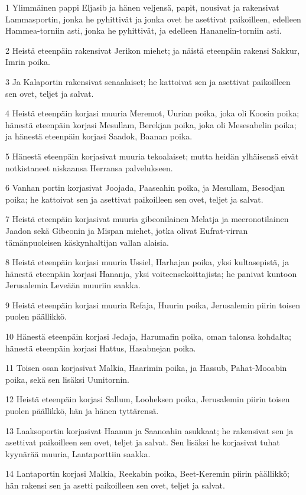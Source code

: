 \par 1 Ylimmäinen pappi Eljasib ja hänen veljensä, papit, nousivat ja rakensivat Lammasportin, jonka he pyhittivät ja jonka ovet he asettivat paikoilleen, edelleen Hammea-torniin asti, jonka he pyhittivät, ja edelleen Hananelin-torniin asti.
\par 2 Heistä eteenpäin rakensivat Jerikon miehet; ja näistä eteenpäin rakensi Sakkur, Imrin poika.
\par 3 Ja Kalaportin rakensivat senaalaiset; he kattoivat sen ja asettivat paikoilleen sen ovet, teljet ja salvat.
\par 4 Heistä eteenpäin korjasi muuria Meremot, Uurian poika, joka oli Koosin poika; hänestä eteenpäin korjasi Mesullam, Berekjan poika, joka oli Mesesabelin poika; ja hänestä eteenpäin korjasi Saadok, Baanan poika.
\par 5 Hänestä eteenpäin korjasivat muuria tekoalaiset; mutta heidän ylhäisensä eivät notkistaneet niskaansa Herransa palvelukseen.
\par 6 Vanhan portin korjasivat Joojada, Paaseahin poika, ja Mesullam, Besodjan poika; he kattoivat sen ja asettivat paikoilleen sen ovet, teljet ja salvat.
\par 7 Heistä eteenpäin korjasivat muuria gibeonilainen Melatja ja meeronotilainen Jaadon sekä Gibeonin ja Mispan miehet, jotka olivat Eufrat-virran tämänpuoleisen käskynhaltijan vallan alaisia.
\par 8 Heistä eteenpäin korjasi muuria Ussiel, Harhajan poika, yksi kultasepistä, ja hänestä eteenpäin korjasi Hananja, yksi voiteensekoittajista; he panivat kuntoon Jerusalemia Leveään muuriin saakka.
\par 9 Heistä eteenpäin korjasi muuria Refaja, Huurin poika, Jerusalemin piirin toisen puolen päällikkö.
\par 10 Hänestä eteenpäin korjasi Jedaja, Harumafin poika, oman talonsa kohdalta; hänestä eteenpäin korjasi Hattus, Hasabnejan poika.
\par 11 Toisen osan korjasivat Malkia, Haarimin poika, ja Hassub, Pahat-Mooabin poika, sekä sen lisäksi Uunitornin.
\par 12 Heistä eteenpäin korjasi Sallum, Looheksen poika, Jerusalemin piirin toisen puolen päällikkö, hän ja hänen tyttärensä.
\par 13 Laaksoportin korjasivat Haanun ja Saanoahin asukkaat; he rakensivat sen ja asettivat paikoilleen sen ovet, teljet ja salvat. Sen lisäksi he korjasivat tuhat kyynärää muuria, Lantaporttiin saakka.
\par 14 Lantaportin korjasi Malkia, Reekabin poika, Beet-Keremin piirin päällikkö; hän rakensi sen ja asetti paikoilleen sen ovet, teljet ja salvat.
